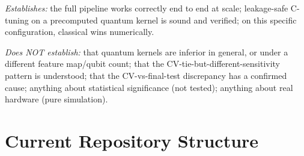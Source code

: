 \documentclass[11pt,a4paper]{article}
\begin{document}
\emph{Establishes:} the full pipeline works correctly end to end at scale; leakage-safe C-tuning on a precomputed quantum kernel is sound and verified; on this specific configuration, classical wins numerically.

\emph{Does NOT establish:} that quantum kernels are inferior in general, or under a different feature map/qubit count; that the CV-tie-but-different-sensitivity pattern is understood; that the CV-vs-final-test discrepancy has a confirmed cause; anything about statistical significance (not tested); anything about real hardware (pure simulation).

\section{Current Repository Structure}
\end{document}
